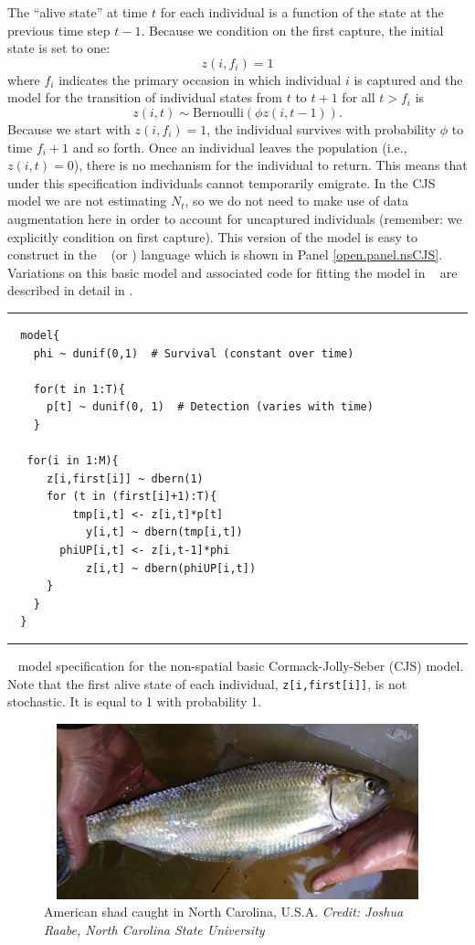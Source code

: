 The ``alive state'' at time $t$ for each individual is a function of
the state at the previous time step $t-1$.  Because we condition on
the first capture, the initial state is set to one:
\[
 z(i, f_i) = 1
\]
where $f_i$ indicates the primary occasion in which individual $i$ is
captured and the model for the transition of individual states from
$t$ to $t+1$ for all $t > f_i$ is
\[
 z(i, t) \sim \mbox{Bernoulli}( \phi z(i, t-1)).
\]
Because we start with $z(i, f_i) = 1$, the individual survives with
probability $\phi$ to time $f_i + 1$ and so forth.  Once an individual
leaves the population (i.e., $z(i, t) = 0$), there is no mechanism for
the individual to return.  This means that under this specification
individuals cannot temporarily emigrate.  In the CJS model we are not
estimating $N_t$, so we do not need to make use of data augmentation
here in order to account for uncaptured individuals (remember: we
explicitly condition on first capture).  This version of the model is
easy to construct in the \bugs~ (or \jags) language which is shown in
Panel \ref{open.panel.nsCJS}.  Variations on this basic model and
associated code for fitting the model in \bugs~ are described in
detail in \citet[][Chapts. 7-9]{kery_schaub:2011}.

\begin{panel}[htp]
\centering
\rule[0.1in]{\textwidth}{.03in}
{\small
\begin{verbatim}
  model{
    phi ~ dunif(0,1)  # Survival (constant over time)
    
    for(t in 1:T){
      p[t] ~ dunif(0, 1)  # Detection (varies with time)
    }

   for(i in 1:M){
      z[i,first[i]] ~ dbern(1)
      for (t in (first[i]+1):T){
          tmp[i,t] <- z[i,t]*p[t]
            y[i,t] ~ dbern(tmp[i,t])
        phiUP[i,t] <- z[i,t-1]*phi
            z[i,t] ~ dbern(phiUP[i,t])
      }
    }
  }
\end{verbatim}
}
\rule[-0.1in]{\textwidth}{.03in}
\caption{ \jags~ model specification for the non-spatial basic
  Cormack-Jolly-Seber (CJS) model. Note that the first alive state of
  each individual, \mbox{\tt z[i,first[i]]}, is not stochastic. It is
  equal to 1 with probability 1.}
\label{open.panel.nsCJS}
\end{panel}


\begin{figure}
\centering
\includegraphics[height=2in,width=4.43in]{Ch16-Open/figs/American_Shad_Raabe.jpg}
\caption{American shad caught in North Carolina, U.S.A.  {\it
Credit: Joshua Raabe, North Carolina State University}  
}
\label{open.figs.shadpic}
\end{figure}

